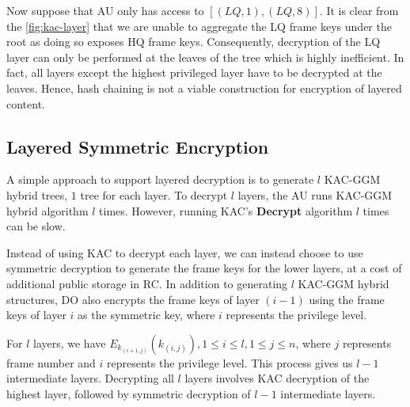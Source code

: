 \documentclass[hyp,a4paper,12pt,openbib]{socreport}
\begin{document}

Now suppose that AU only has access to $[(LQ, 1), (LQ,8)]$. It is clear from the \cref{fig:kac-layer} that we are unable to aggregate the LQ frame keys under the root as doing so exposes HQ frame keys. Consequently, decryption of the LQ layer can only be performed at the leaves of the tree which is highly inefficient. In fact, all layers except the highest privileged layer have to be decrypted at the leaves.  Hence, hash chaining is not a viable construction for encryption of layered content.

\subsection{Layered Symmetric Encryption}

A simple approach to support layered decryption is to generate $l$ KAC-GGM hybrid trees, $1$ tree for each layer. To decrypt $l$ layers, the AU runs KAC-GGM hybrid algorithm $l$ times. However, running KAC's \textbf{Decrypt} algorithm $l$ times can be slow.

Instead of using KAC to decrypt each layer, we can instead choose to use symmetric decryption to generate the frame keys for the lower layers, at a cost of additional public storage in RC. In addition to generating $l$ KAC-GGM hybrid structures, DO also encrypts the frame keys of layer $(i-1)$ using the frame keys of layer $i$ as the symmetric key, where $i$ represents the privilege level. 

For $l$ layers, we have $E_{k_{(i+1,j)}}(k_{(i,j)}), 1 \leq i \leq l, 1 \leq j \leq n$, where  $j$ represents frame number and $i$ represents the privilege level. This process gives us $l-1$ intermediate layers. Decrypting all $l$ layers involves KAC decryption of the highest layer, followed by symmetric decryption of $l-1$ intermediate layers. 

%
%
\end{document}
